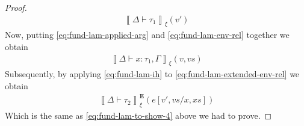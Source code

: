 \documentclass{article}
\newcommand{\semtyp}[3]{\left\llbracket #2 \vdash #3 \right\rrbracket_{#1}}
\newcommand{\semErel}[1]{#1^{\textbf{E}}}
\newcommand{\semenv}{\xi}
\newcommand{\Tctx}{\Gamma}
\newcommand{\CtxTps}{\Delta}
\newcommand{\expr}{e}
\newcommand{\val}{v}
\newcommand{\var}{x}
\newcommand{\typ}{\tau}
\begin{document}
\begin{proof}
\begin{align}
  \label{eq:fund-lam-applied-arg}
  \semtyp{\semenv}{\CtxTps}{\typ_1}(\val')
\end{align}
Now, putting \eqref{eq:fund-lam-applied-arg} and \eqref{eq:fund-lam-env-rel} together we obtain
\begin{align}
  \label{eq:fund-lam-extended-env-rel}
  \semtyp{\semenv}{\CtxTps}{\var : \typ_1,\Tctx}(\val, \mathit{vs})
\end{align}
Subsequently, by applying \eqref{eq:fund-lam-ih} to \eqref{eq:fund-lam-extended-env-rel} we obtain
\begin{align}
  \label{eq:fund-lam-ih-consequence}
  \semErel{\semtyp{\semenv}{\CtxTps}{\typ_2}}(\expr[\val', \mathit{vs}/\var, \mathit{xs}])
\end{align}
Which is the same as \eqref{eq:fund-lam-to-show-4} above we had to prove.


\end{proof}
\end{document}
